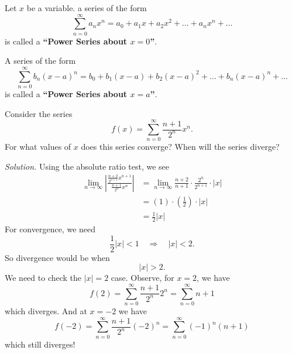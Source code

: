 %

Let $x$ be a variable. a series of the form
\begin{equation}
\sum^{\infty}_{n=0}a_{n}x^{n}=a_{0}+a_{1}x+a_{2}x^{2}+\dots+a_{n}x^{n}+\dots
\end{equation}
is called a \textbf{``Power Series about $x=0$''}.

A series of the form
\begin{equation}
\sum^{\infty}_{n=0}b_{n}(x-a)^{n}=b_{0}+b_{1}(x-a)+b_{2}(x-a)^{2}+\dots+b_{n}(x-a)^{n}+\dots
\end{equation}
is called a \textbf{``Power Series about $x=a$''}.

\begin{example}
Consider the series
\begin{equation}
f(x)=\sum^{\infty}_{n=0}\frac{n+1}{2^{n}}x^{n}.
\end{equation}
For what values of $x$ does this series converge? When will the
series diverge?\more{}

\emph{Solution.} Using the absolute ratio test, we see
\begin{equation}
\begin{aligned}
\lim_{n\to\infty}\left|\frac{\displaystyle\frac{n+2}{2^{n+1}}x^{n+1}}{\displaystyle\frac{n+1}{2^{n}}x^{n}}\right|
&=\lim_{n\to\infty}\frac{n+2}{n+1}\cdot\frac{2^{n}}{2^{n+1}}\cdot|x|\\
&=(1)\cdot\left(\frac{1}{2}\right)\cdot|x|\\
&=\frac{1}{2}|x|
\end{aligned}
\end{equation}
For convergence, we need
\begin{equation}
\frac{1}{2}|x|<1\quad\Longrightarrow\quad|x|<2.
\end{equation}
So divergence would be when
\begin{equation}
|x|>2.
\end{equation}
We need to check the $|x|=2$ case. Observe, for $x=2$, we have
\begin{equation}
f(2)=\sum^{\infty}_{n=0}\frac{n+1}{2^{n}}2^{n}=\sum^{\infty}_{n=0}n+1
\end{equation}
which diverges. And at $x=-2$ we have
\begin{equation}
f(-2)=\sum^{\infty}_{n=0}\frac{n+1}{2^{n}}(-2)^{n}=\sum^{\infty}_{n=0}(-1)^{n}(n+1)
\end{equation}
which still diverges!
\end{example}


